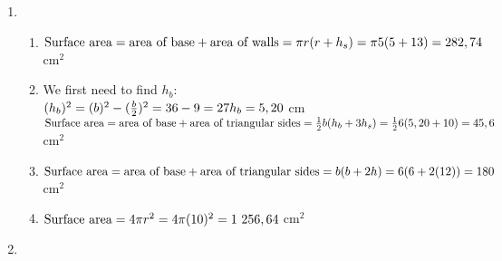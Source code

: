  \begin{solutions}{}{
\begin{enumerate}[itemsep=5pt, label=\textbf{\arabic*}. ] 
\item \begin{enumerate}[itemsep=5pt, label=\textbf{(\alph*)}]
       \item $\mbox{Surface area} = \mbox{area of base} + \mbox{area of walls}\\
= \pi r(r + h_s)\\
=\pi 5(5 + 13) \\
= 282,74 ~$cm$^{2}$
  \item We first need to find $h_b$:\\
$(h_b)^2 = (b)^2 - (\frac{b}{2})^2 \\
= 36 - 9 \\
= 27 \\
h_b = 5,20 ~$cm\\
$\mbox{Surface area} = \mbox{area of base} + \mbox{area of triangular sides}\\
=\frac{1}{2}b(h_{b} + 3h_{s})\\
=\frac{1}{2}6(5,20 + 10)\\
= 45,6 ~$cm$^{2}$
  \item 
$\mbox{Surface area} = \mbox{area of base} + \mbox{area of triangular sides}\\
= b(b + 2h)\\
= 6(6 + 2(12)) \\
= 180~$cm$^2$
  \item $\mbox{Surface area} = 4 \pi r^2 \\
= 4 \pi (10)^2 \\
= 1~256,64 ~$cm$^2$
      \end{enumerate}
\item {}
\end{enumerate}}
\end{solutions}
